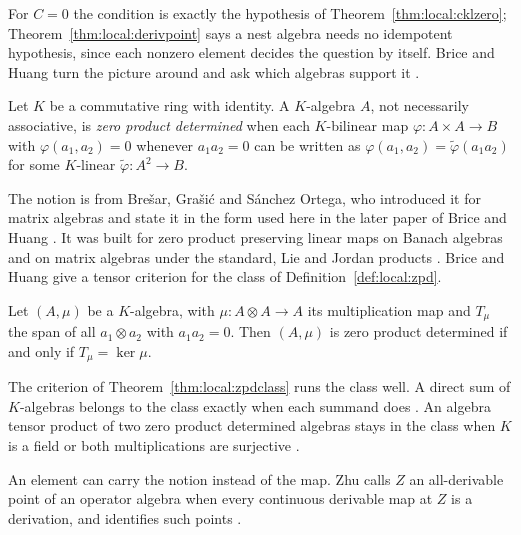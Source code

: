 For $C=0$ the condition is exactly the hypothesis of
Theorem~\ref{thm:local:cklzero}; Theorem~\ref{thm:local:derivpoint} says a
nest algebra needs no idempotent hypothesis, since each nonzero element
decides the question by itself. Brice and Huang turn the picture around and
ask which algebras support it \cite[p.~326]{BriceHuang2015}.

\begin{definition}\label{def:local:zpd}
Let $K$ be a commutative ring with identity. A $K$-algebra $A$, not
necessarily associative, is \emph{zero product determined} when each
$K$-bilinear map $\varphi\colon A\times A\to B$ with $\varphi(a_1,a_2)=0$
whenever $a_1a_2=0$ can be written as $\varphi(a_1,a_2)=\tilde{\varphi}(a_1a_2)$
for some $K$-linear $\tilde{\varphi}\colon A^2\to B$.
\end{definition}

The notion is from Bre\v{s}ar, Gra\v{s}i\'c and S\'anchez Ortega, who
introduced it for matrix algebras
\cite[pp.~1486--1498]{BresarGrasicSanchezOrtega2009} and state it in the form
used here in the later paper of Brice and Huang
\cite[pp.~326--327]{BriceHuang2015}.
It was built for zero product preserving
linear maps on Banach algebras and on matrix algebras under the standard,
Lie and Jordan products \cite[p.~327]{BriceHuang2015}.
Brice and Huang give a tensor criterion for the class of
Definition~\ref{def:local:zpd}.

\begin{theorem}\label{thm:local:zpdclass}
Let $(A,\mu)$ be a $K$-algebra, with $\mu\colon A\otimes A\to A$ its
multiplication map and $T_\mu$ the span of all $a_1\otimes a_2$ with
$a_1a_2=0$. Then $(A,\mu)$ is zero product determined if and only if
$T_\mu=\ker\mu$.
\end{theorem}

The criterion of Theorem~\ref{thm:local:zpdclass} runs the class well. A
direct sum of $K$-algebras belongs to the class exactly when each summand
does \cite[Theorem~3.1, p.~331]{BriceHuang2015}. An algebra tensor product
of two zero product determined algebras stays in the class when $K$ is a
field or both multiplications are surjective
\cite[Theorem~4.3, pp.~331--332]{BriceHuang2015}.

An element can carry the notion instead of the map. Zhu calls $Z$ an
all-derivable point of an operator algebra when every continuous derivable map at
$Z$ is a derivation, and identifies such points
\cite[Abstract]{Zhu2007AllDerivable}.

